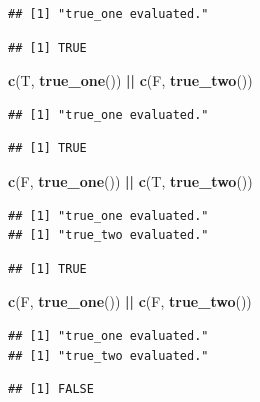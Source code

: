 \documentclass[]{book}
\newenvironment{Shaded}{\begin{snugshade}}{\end{snugshade}}
\newcommand{\KeywordTok}[1]{\textcolor[rgb]{0.13,0.29,0.53}{\textbf{#1}}}
\newcommand{\NormalTok}[1]{#1}
\newcommand{\OperatorTok}[1]{\textcolor[rgb]{0.81,0.36,0.00}{\textbf{#1}}}
\newcommand{\StringTok}[1]{\textcolor[rgb]{0.31,0.60,0.02}{#1}}
\begin{document}
\begin{verbatim}
## [1] "true_one evaluated."
\end{verbatim}

\begin{verbatim}
## [1] TRUE
\end{verbatim}

\begin{Shaded}
\begin{Highlighting}[]
\KeywordTok{c}\NormalTok{(T, }\KeywordTok{true_one}\NormalTok{()) }\OperatorTok{||}\StringTok{ }\KeywordTok{c}\NormalTok{(F, }\KeywordTok{true_two}\NormalTok{())}
\end{Highlighting}
\end{Shaded}

\begin{verbatim}
## [1] "true_one evaluated."
\end{verbatim}

\begin{verbatim}
## [1] TRUE
\end{verbatim}

\begin{Shaded}
\begin{Highlighting}[]
\KeywordTok{c}\NormalTok{(F, }\KeywordTok{true_one}\NormalTok{()) }\OperatorTok{||}\StringTok{ }\KeywordTok{c}\NormalTok{(T, }\KeywordTok{true_two}\NormalTok{()) }
\end{Highlighting}
\end{Shaded}

\begin{verbatim}
## [1] "true_one evaluated."
## [1] "true_two evaluated."
\end{verbatim}

\begin{verbatim}
## [1] TRUE
\end{verbatim}

\begin{Shaded}
\begin{Highlighting}[]
\KeywordTok{c}\NormalTok{(F, }\KeywordTok{true_one}\NormalTok{()) }\OperatorTok{||}\StringTok{ }\KeywordTok{c}\NormalTok{(F, }\KeywordTok{true_two}\NormalTok{()) }
\end{Highlighting}
\end{Shaded}

\begin{verbatim}
## [1] "true_one evaluated."
## [1] "true_two evaluated."
\end{verbatim}

\begin{verbatim}
## [1] FALSE
\end{verbatim}
\end{document}
